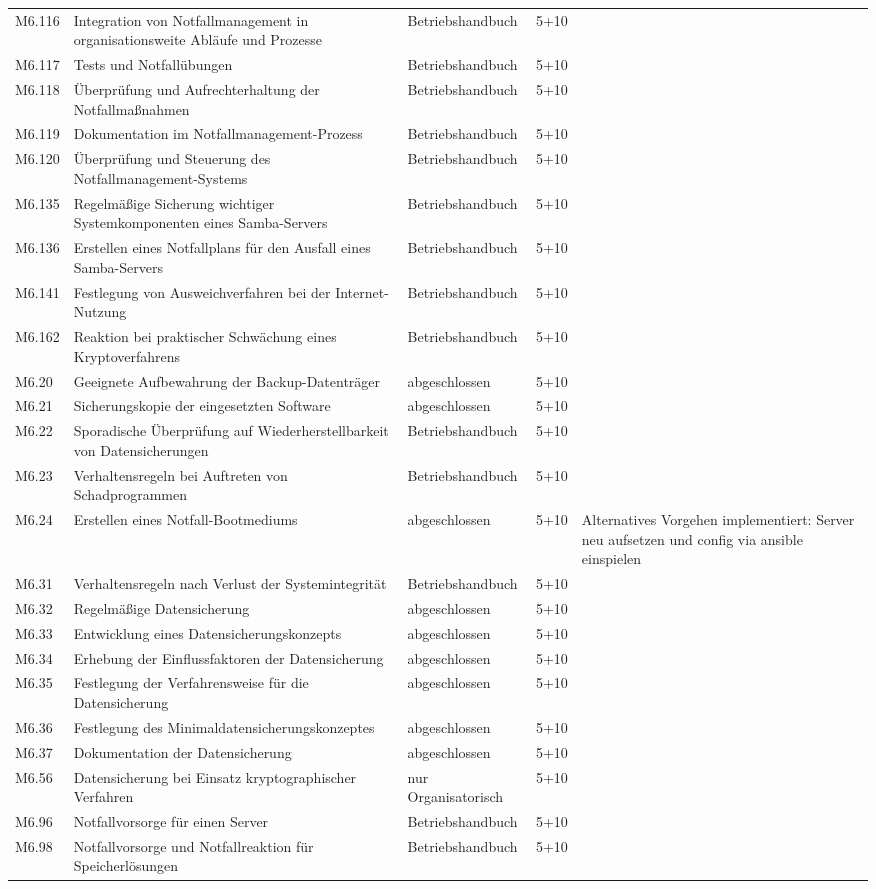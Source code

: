 \begin{longtable}{lp{3.7cm}p{3cm}lp{3.8cm}}
M6.116 & Integration von Notfallmanagement in organisationsweite Abläufe und Prozesse & Betriebshandbuch & 5+10 &  \\
M6.117 & Tests und Notfallübungen & Betriebshandbuch & 5+10 &  \\
M6.118 & Überprüfung und Aufrechterhaltung der Notfallmaßnahmen & Betriebshandbuch & 5+10 &  \\
M6.119 & Dokumentation im Notfallmanagement-Prozess & Betriebshandbuch & 5+10 &  \\
M6.120 & Überprüfung und Steuerung des Notfallmanagement-Systems & Betriebshandbuch & 5+10 &  \\
M6.135 & Regelmäßige Sicherung wichtiger Systemkomponenten eines Samba-Servers & Betriebshandbuch & 5+10 &  \\
M6.136 &  Erstellen eines Notfallplans für den Ausfall eines Samba-Servers & Betriebshandbuch & 5+10 &  \\
M6.141 & Festlegung von Ausweichverfahren bei der Internet-Nutzung & Betriebshandbuch & 5+10 &  \\
M6.162 & Reaktion bei praktischer Schwächung eines Kryptoverfahrens & Betriebshandbuch & 5+10 &  \\
M6.20 & Geeignete Aufbewahrung der Backup-Datenträger & abgeschlossen & 5+10 &  \\
M6.21 & Sicherungskopie der eingesetzten Software & abgeschlossen & 5+10 &  \\
M6.22 & Sporadische Überprüfung auf Wiederherstellbarkeit von Datensicherungen & Betriebshandbuch & 5+10 &  \\
M6.23 & Verhaltensregeln bei Auftreten von Schadprogrammen & Betriebshandbuch & 5+10 &  \\
M6.24 & Erstellen eines Notfall-Bootmediums & abgeschlossen & 5+10 & Alternatives Vorgehen implementiert: Server neu aufsetzen und config via ansible einspielen \\
M6.31 & Verhaltensregeln nach Verlust der Systemintegrität & Betriebshandbuch & 5+10 &  \\
M6.32 & Regelmäßige Datensicherung & abgeschlossen & 5+10 &  \\
M6.33 & Entwicklung eines Datensicherungskonzepts & abgeschlossen & 5+10 &  \\
M6.34 & Erhebung der Einflussfaktoren der Datensicherung & abgeschlossen & 5+10 &  \\
M6.35 & Festlegung der Verfahrensweise für die Datensicherung & abgeschlossen & 5+10 &  \\
M6.36 & Festlegung des Minimaldatensicherungskonzeptes & abgeschlossen & 5+10 &  \\
M6.37 & Dokumentation der Datensicherung & abgeschlossen & 5+10 &  \\
M6.56 & Datensicherung bei Einsatz kryptographischer Verfahren & nur Organisatorisch & 5+10 &  \\
M6.96 & Notfallvorsorge für einen Server & Betriebshandbuch & 5+10 &  \\
M6.98 & Notfallvorsorge und Notfallreaktion für Speicherlösungen & Betriebshandbuch & 5+10 &  \\
\bottomrule
\end{longtable}


